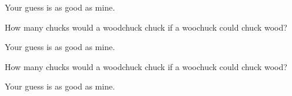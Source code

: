 \documentclass[12pt]{article}
\newenvironment{question}[2][Q]{\begin{trivlist}
\item[\hskip \labelsep {\bfseries #1}\hskip \labelsep {\bfseries #2.}]}{\end{trivlist}}
\newenvironment{answer}[2][A]{\begin{trivlist}
\item[\hskip \labelsep {\bfseries #1}\hskip \labelsep {\bfseries #2.}]}{\end{trivlist}}
\begin{document}
\begin{answer}{34}
Your guess is as good as mine.
\end{answer}
\begin{question}{35}
  How many chucks would a woodchuck chuck if a woochuck could chuck wood?
\end{question}

\begin{answer}{35}
Your guess is as good as mine.
\end{answer}
\begin{question}{36}
  How many chucks would a woodchuck chuck if a woochuck could chuck wood?
\end{question}

\begin{answer}{36}
Your guess is as good as mine.
\end{answer}


 
\end{document}
